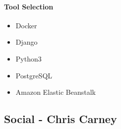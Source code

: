 \documentclass{article}
\begin{document}
\paragraph{Tool Selection}
\begin{itemize}
    \item Docker
    \item Django
    \item Python3
    \item PostgreSQL
    \item Amazon Elastic Beanstalk
\end{itemize}

\subsection{Social - Chris Carney}
\end{document}
